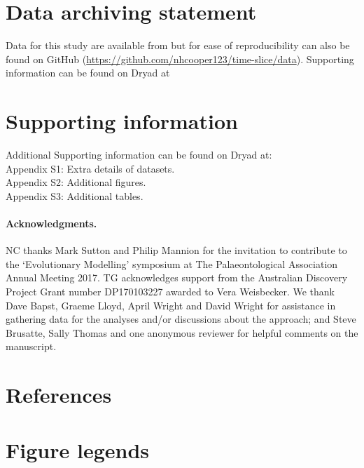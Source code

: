\documentclass[12pt,a4paper]{article}
\begin{document}
\section{Data archiving statement}
Data for this study are available from \cite{dryad_n2g80,dryad_6hb7j,dryad_84t75,beckancient2014} but for ease of reproducibility can also be found on GitHub (\url{https://github.com/nhcooper123/time-slice/data}). %
Supporting information can be found on Dryad at %

\section{Supporting information}
Additional Supporting information can be found on Dryad at:\\
Appendix S1: Extra details of datasets. \\
Appendix S2: Additional figures. \\
Appendix S3: Additional tables.

\paragraph{Acknowledgments.}
  NC thanks Mark Sutton and Philip Mannion for the invitation to contribute to the `Evolutionary Modelling' symposium at The Palaeontological Association Annual Meeting 2017.
  TG acknowledges support from the Australian Discovery Project Grant number DP170103227 awarded to Vera Weisbecker.
  We thank Dave Bapst, Graeme Lloyd, April Wright and David Wright for assistance in gathering data for the analyses and/or discussions about the approach; and Steve Brusatte, Sally Thomas and one anonymous reviewer for helpful comments on the manuscript.

\section{References}

 
 

\newpage
\section{Figure legends}
\end{document}
